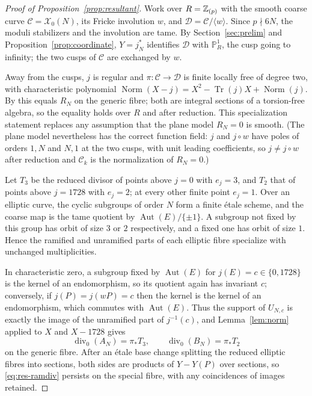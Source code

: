 \documentclass[11pt,a4paper]{article}
\theoremstyle{remark}\newtheorem{remark}[theorem]{Remark}
\numberwithin{equation}{section}
\begin{document}
	\begin{proof}[Proof of Proposition~\ref{prop:resultant}]
		Work over $R=\mathbb Z_{(p)}$ with the smooth coarse curve $\mathcal C=\mathscr X_0(N)$, its Fricke involution $w$, and $\mathcal D=\mathcal C/\langle w\rangle$. Since $p\nmid 6N$, the moduli stabilizers and the involution are tame. By Section~\ref{sec:prelim} and Proposition~\ref{prop:coordinate}, $Y=j_N^*$ identifies $\mathcal D$ with $\mathbb P^1_R$, the cusp going to infinity; the two cusps of $\mathcal C$ are exchanged by $w$.
		
		Away from the cusps, $j$ is regular and $\pi\colon\mathcal C\to\mathcal D$ is finite locally free of degree two, with characteristic polynomial $\operatorname{Norm}(X-j)=X^2-\operatorname{Tr}(j)X+\operatorname{Norm}(j)$. By \cite[Proposition~4]{Nakaya} this equals $R_N$ on the generic fibre; both are integral sections of a torsion-free algebra, so the equality holds over $R$ and after reduction. This specialization statement replaces any assumption that the plane model $R_N=0$ is smooth. (The plane model nevertheless has the correct function field: $j$ and $j\circ w$ have poles of orders $1,N$ and $N,1$ at the two cusps, with unit leading coefficients, so $j\neq j\circ w$ after reduction and $\mathcal C_k$ is the normalization of $R_N=0$.)
		
		Let $T_3$ be the reduced divisor of points above $j=0$ with $e_j=3$, and $T_2$ that of points above $j=1728$ with $e_j=2$; at every other finite point $e_j=1$. Over an elliptic curve, the cyclic subgroups of order $N$ form a finite \'etale scheme, and the coarse map is the tame quotient by $\operatorname{Aut}(E)/\{\pm1\}$. A subgroup not fixed by this group has orbit of size $3$ or $2$ respectively, and a fixed one has orbit of size $1$. Hence the ramified and unramified parts of each elliptic fibre specialize with unchanged multiplicities.
		
		In characteristic zero, a subgroup fixed by $\operatorname{Aut}(E)$ for $j(E)=c\in\{0,1728\}$ is the kernel of an endomorphism, so its quotient again has invariant $c$; conversely, if $j(P)=j(wP)=c$ then the kernel is the kernel of an endomorphism, which commutes with $\operatorname{Aut}(E)$. Thus the support of $U_{N,c}$ is exactly the image of the unramified part of $j^{-1}(c)$, and Lemma~\ref{lem:norm} applied to $X$ and $X-1728$ gives
		\begin{equation}\label{eq:res-ramdiv}
			\operatorname{div}_0(A_N)=\pi_*T_3,\qquad \operatorname{div}_0(B_N)=\pi_*T_2
		\end{equation}
		on the generic fibre. After an \'etale base change splitting the reduced elliptic fibres into sections, both sides are products of $Y-Y(P)$ over sections, so \eqref{eq:res-ramdiv} persists on the special fibre, with any coincidences of images retained.
		

\end{proof}
\end{document}
